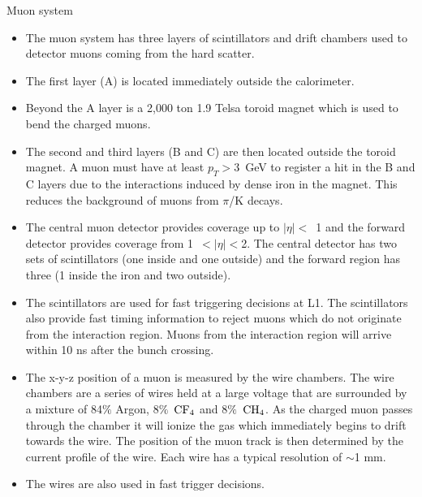 Muon system
\begin{itemize}
\item The muon system has three layers of scintillators and drift chambers used to detector muons coming from the hard scatter.
\item The first layer (A) is located immediately outside the calorimeter.
\item Beyond the A layer is a 2,000 ton 1.9 Telsa toroid magnet which is used to bend the charged muons.
\item The second and third layers (B and C) are then located outside the toroid magnet. A muon must have at least $p_{T} > 3$~GeV to register a hit in the B and C layers due to the interactions induced by dense iron in the magnet. This reduces the background of muons from $\pi$/K decays.
\item The central muon detector provides coverage up to $|\eta| <$~1 and the forward detector provides coverage from  1~$< |\eta| <$2. The central detector has two sets of scintillators (one inside and one outside) and the forward region has three (1 inside the iron and two outside).
\item The scintillators are used for fast triggering decisions at L1. The scintillators also provide fast timing information to reject muons which do not originate from the interaction region. Muons from the interaction region will arrive within 10 ns after the bunch crossing.
\item The x-y-z position of a muon is measured by the wire chambers. The wire chambers are a series of wires held at a large voltage that are surrounded by a mixture of 84$\%$ Argon, $8\%$~$\rm{CF}_{4}$ and $8\%$~$\rm{CH}_{4}$. As the charged muon passes through the chamber it will ionize the gas which immediately begins to drift towards the wire. The position of the muon track is then determined by the current profile of the wire. Each wire has a typical resolution of $\sim$1 mm.
\item The wires are also used in fast trigger decisions.
\end{itemize}


